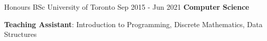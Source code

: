 
\begin{cventries}
  \cventry
    {Honours BSc}
    {University of Toronto}
    {}
    {Sep 2015 - Jun 2021}
    {\textbf{Computer Science}}
    {
      \begin{cvitems}
        \item {\textbf{Teaching Assistant}: Introduction to Programming, Discrete Mathematics, Data Structures}
      \end{cvitems}
    }
\end{cventries}
